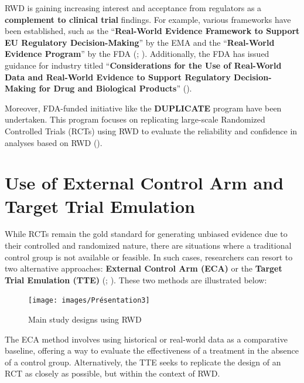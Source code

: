 \documentclass[
]{book}
\begin{document}
RWD is gaining increasing interest and acceptance from regulators as a
\textbf{complement to clinical trial} findings. For example, various
frameworks have been established, such as the ``\textbf{Real-World
Evidence Framework to Support EU Regulatory Decision-Making}'' by the
EMA and the ``\textbf{Real-World Evidence Program}'' by the FDA
(;
). Additionally, the FDA has
issued guidance for industry titled ``\textbf{Considerations for the Use
of Real-World Data and Real-World Evidence to Support Regulatory
Decision-Making for Drug and Biological Products}''
().

Moreover, FDA-funded initiative like the \textbf{DUPLICATE} program have
been undertaken. This program focuses on replicating large-scale
Randomized Controlled Trials (RCTs) using RWD to evaluate the
reliability and confidence in analyses based on RWD
().

\section{Use of External Control Arm and Target Trial
Emulation}\label{use-of-external-control-arm-and-target-trial-emulation}

While RCTs remain the gold standard for generating unbiased evidence due
to their controlled and randomized nature, there are situations where a
traditional control group is not available or feasible. In such cases,
researchers can resort to two alternative approaches: \textbf{External
Control Arm (ECA)} or the \textbf{Target Trial Emulation (TTE)}
(;
). These two
methods are illustrated below:

\begin{figure}

{\centering \texttt{[image: images/Présentation3]} 

}

\caption{Main study designs using RWD}\label{fig:unnamed-chunk-3}
\end{figure}

The ECA method involves using historical or real-world data as a
comparative baseline, offering a way to evaluate the effectiveness of a
treatment in the absence of a control group. Alternatively, the TTE
seeks to replicate the design of an RCT as closely as possible, but
within the context of RWD.
\end{document}
